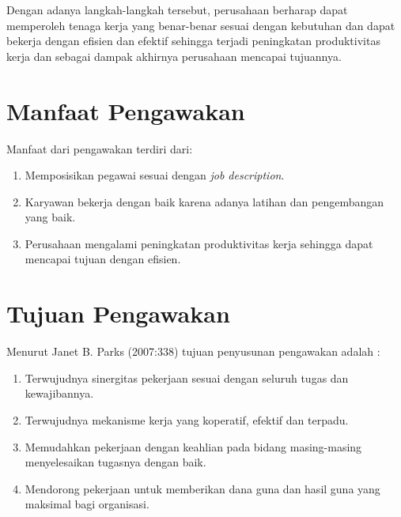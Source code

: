 Dengan adanya langkah-langkah tersebut, perusahaan berharap dapat memperoleh tenaga kerja yang benar-benar sesuai dengan kebutuhan dan dapat bekerja dengan efisien dan efektif sehingga terjadi peningkatan produktivitas kerja dan sebagai dampak akhirnya perusahaan mencapai tujuannya.

\section{Manfaat Pengawakan}

Manfaat dari pengawakan terdiri dari:

\begin{enumerate}

\item Memposisikan pegawai sesuai dengan \textit{job description}.

\item Karyawan bekerja dengan baik karena adanya latihan dan pengembangan yang baik.

\item Perusahaan mengalami peningkatan produktivitas kerja sehingga dapat mencapai tujuan dengan efisien.

\end{enumerate}

\section{Tujuan Pengawakan}

Menurut Janet B. Parks (2007:338) tujuan penyusunan pengawakan adalah \cite{3}:

\begin{enumerate}

\item Terwujudnya sinergitas pekerjaan sesuai dengan seluruh tugas dan kewajibannya.

\item Terwujudnya mekanisme kerja yang koperatif, efektif dan terpadu.

\item Memudahkan pekerjaan dengan keahlian pada bidang masing-masing menyelesaikan tugasnya dengan baik.

\item Mendorong pekerjaan untuk memberikan dana guna dan hasil guna yang maksimal bagi organisasi.

\end{enumerate}

